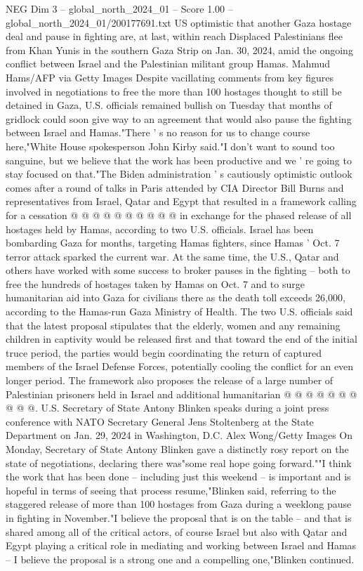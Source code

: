 \begin{textsample}{NEG Dim 3 – global\_north\_2024\_01 – Score 1.00 – global\_north\_2024\_01/200177691.txt}  \label{ex:f3_neg_234}
US optimistic that another Gaza hostage deal and pause in fighting are, at last, within reach Displaced Palestinians flee from Khan Yunis in the southern Gaza Strip on Jan. 30, 2024, amid the ongoing conflict between Israel and the Palestinian militant group Hamas.
Mahmud Hams/AFP via Getty Images Despite vacillating comments from key figures involved in negotiations to free the more than 100 hostages thought to still be detained in Gaza, U.S. officials remained bullish on Tuesday that months of gridlock could soon give way to an agreement that would also pause the fighting between Israel and Hamas."There ' s no reason for us to change course here,"White House spokesperson John Kirby said."I don't want to sound too sanguine, but we believe that the work has been productive and we ' re going to stay focused on that."The Biden administration ' s cautiously optimistic outlook comes after a round of talks in Paris attended by CIA Director Bill Burns and representatives from Israel, Qatar and Egypt that resulted in a framework calling for a cessation @ @ @ @ @ @ @ @ @ @ in exchange for the phased release of all hostages held by Hamas, according to two U.S. officials.
Israel has been bombarding Gaza for months, targeting Hamas fighters, since Hamas ' Oct. 7 terror attack sparked the current war.
At the same time, the U.S., Qatar and others have worked with some success to broker pauses in the fighting -- both to free the hundreds of hostages taken by Hamas on Oct. 7 and to surge humanitarian aid into Gaza for civilians there as the death toll exceeds 26,000, according to the Hamas-run Gaza Ministry of Health.
The two U.S. officials said that the latest proposal stipulates that the elderly, women and any remaining children in captivity would be released first and that toward the end of the initial truce period, the parties would begin coordinating the return of captured members of the Israel Defense Forces, potentially cooling the conflict for an even longer period.
The framework also proposes the release of a large number of Palestinian prisoners held in Israel and additional humanitarian @ @ @ @ @ @ @ @ @ @.
U.S.
Secretary of State Antony Blinken speaks during a joint press conference with NATO Secretary General Jens Stoltenberg at the State Department on Jan. 29, 2024 in Washington, D.C.
Alex Wong/Getty Images On Monday, Secretary of State Antony Blinken gave a distinctly rosy report on the state of negotiations, declaring there was"some real hope going forward.""I think the work that has been done -- including just this weekend -- is important and is hopeful in terms of seeing that process resume,"Blinken said, referring to the staggered release of more than 100 hostages from Gaza during a weeklong pause in fighting in November."I believe the proposal that is on the table -- and that is shared among all of the critical actors, of course Israel but also with Qatar and Egypt playing a critical role in mediating and working between Israel and Hamas -- I believe the proposal is a strong one and a compelling one,"Blinken continued.

\end{textsample}
